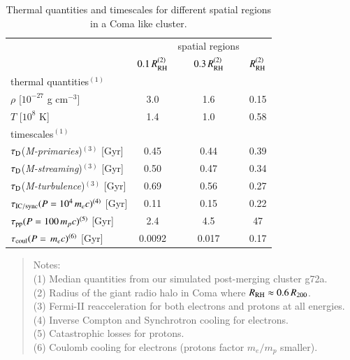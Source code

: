\documentclass[a4paper,fleqn,usenatbib]{mnras}
\newcommand{\Mstream}{{\it M-streaming}\xspace}
\newcommand{\Mflatturb}{{\it M-turbulence}\xspace}
\newcommand{\Mprimary}{{\it M-primaries}\xspace}
\newcommand{\RH}{R_\rmn{RH}}
\begin{document}
\begin{table}
  \caption{Thermal quantities and timescales for different spatial
    regions in a Coma like cluster.}
\begin{tabular}{l c  c c}
\hline
\hline
& & spatial regions & \\
 & $0.1\,\RH^{(2)}$ & $0.3\,\RH^{(2)}$ & $\RH^{(2)}$   \\
\hline
thermal quantities$^{(1)}$ & & & \\
$\rho$ [$10^{-27}$ g cm$^{-3}$] & 3.0 & 1.6 & 0.15 \\
$T$ [$10^{8}$ K] & 1.4 & 1.0 & 0.58 \\
\hline
timescales$^{(1)}$ & & & \\
$\tau_{\mathrm{D}}$(\Mprimary)$^{(3)}$ [Gyr] & 0.45 & 0.44 & 0.39 \\
$\tau_{\mathrm{D}}$(\Mstream)$^{(3)}$  [Gyr] & 0.50 & 0.47 & 0.34 \\
$\tau_{\mathrm{D}}$(\Mflatturb)$^{(3)}$  [Gyr] & 0.69 & 0.56 & 0.27 \\
$\tau_{\mathrm{IC/sync}}(P=10^4\,m_ec)^{(4)}$ [Gyr] & 0.11 & 0.15 & 0.22 \\
$\tau_{\mathrm{pp}}(P=100\,m_pc)^{(5)}$ [Gyr] & 2.4 & 4.5 & 47 \\
$\tau_{\mathrm{coul}}(P=\,m_ec)^{(6)}$  [Gyr] & 0.0092 & 0.017 & 0.17 \\
\hline
\end{tabular}
\begin{quote}
 Notes: \\ 
 (1) Median quantities from our simulated post-merging cluster g72a.\\
 (2) Radius of the giant radio halo in Coma where $\RH\approx0.6\,R_{200}$.\\
 (3) Fermi-II reacceleration for both electrons and protons at all energies.\\
 (4) Inverse Compton and Synchrotron cooling for electrons.\\
 (5) Catastrophic losses for protons.\\
 (6) Coulomb cooling for electrons (protons factor $m_e/m_p$ smaller).\\

 \label{tab:timescales}
  \end{quote}
\end{table} 


\end{document}

